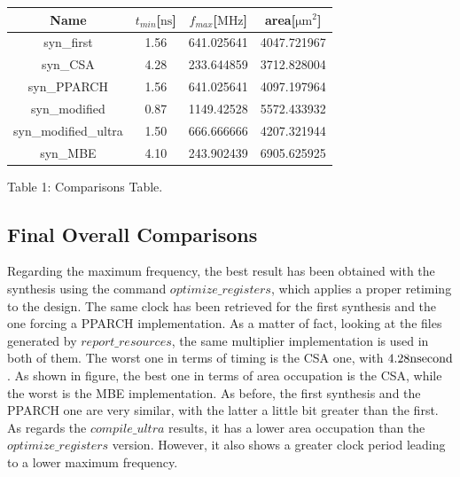 \begin{center}
    \begin{tabular}{ |c|c|c|c| } 
        \hline
            Name & $t_{min}$[$\si{\nano\second}$] & $f_{max}$[$\si{\mega\hertz}$] & area[$\si{\micro\meter}^{2}$]\\
            \hline
            syn\_first & 1.56 & 641.025641 & 4047.721967\\
            \hline
            syn\_CSA & 4.28 & 233.644859 & 3712.828004\\
            \hline
            syn\_PPARCH & 1.56 & 641.025641 & 4097.197964\\
            \hline
            syn\_modified & 0.87 & 1149.42528 & 5572.433932\\
            \hline
            syn\_modified\_ultra & 1.50 & 666.666666 & 4207.321944\\
            \hline
            syn\_MBE & 4.10 & 243.902439 & 6905.625925\\
        	\hline
    \end{tabular}
    \begin{center}
    	Table 1: Comparisons Table.
    \end{center}
\end{center}


\subsection{Final Overall Comparisons}

Regarding the maximum frequency, the best result has been obtained with the synthesis using the command $optimize\_registers$, which applies a proper retiming to the design. The same clock has been retrieved for the first synthesis and the one forcing a PPARCH implementation. As a matter of fact, looking at the files generated by $report\_resources$, the same multiplier implementation is used in both of them. The worst one in terms of timing is the CSA one, with $4.28\si{\nano\\second}$.
As shown in figure, the best one in terms of area occupation is the CSA, while the worst is the MBE implementation. As before, the first synthesis and the PPARCH one are very similar, with the latter a little bit greater than the first. As regards the $compile\_ultra$ results, it has a lower area occupation than the $optimize\_registers$ version. However, it also shows a greater clock period leading to a lower maximum frequency.
